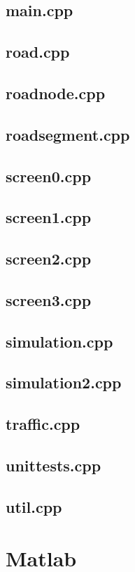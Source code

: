 \documentclass{article}
\begin{document}
  \subsection{main.cpp}
    
  \subsection{road.cpp}
    
  \subsection{roadnode.cpp}
    
  \subsection{roadsegment.cpp}
    
  \subsection{screen0.cpp}
    
  \subsection{screen1.cpp}
    
  \subsection{screen2.cpp}
    
  \subsection{screen3.cpp}
    
  \subsection{simulation.cpp}
    
  \subsection{simulation2.cpp}
    
  \subsection{traffic.cpp}
    
  \subsection{unittests.cpp}
    
  \subsection{util.cpp}
    
\section{Matlab}
  
\end{document}

